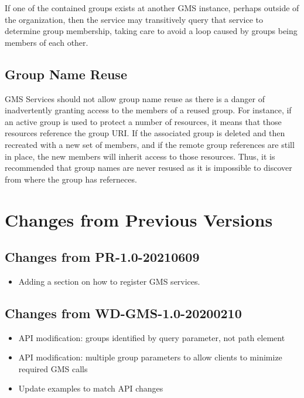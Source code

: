 \documentclass[11pt,a4paper]{ivoa}
\begin{document}
If one of the contained groups exists at another GMS instance, perhaps outside of the organization, then the service may transitively query that service to determine group membership, taking care to avoid a loop caused by groups being members of each other.

\subsection{Group Name Reuse}
\label{subsec:groupnamereuse}

GMS Services should not allow group name reuse as there is a danger of inadvertently granting access to the members of a reused group.  For instance, if an active group is used to protect a number of resources, it means that those resources reference the group URI.  If the associated group is deleted and then recreated with a new set of members, and if the remote group references are still in place, the new members will inherit access to those resources.  Thus, it is recommended that group names are never resused as it is impossible to discover from where the group has referneces.

\appendix

\section{Changes from Previous Versions}
\label{sec:changehistory}

\subsection{Changes from PR-1.0-20210609}

\begin{itemize}
\item Adding a section on how to register GMS services.
\end{itemize}

\subsection{Changes from WD-GMS-1.0-20200210}
\begin{itemize}
\item{API modification: groups identified by query parameter, not path element}
\item{API modification: multiple group parameters to allow clients to minimize required GMS calls}
\item{Update examples to match API changes}
\end{itemize}
\end{document}

